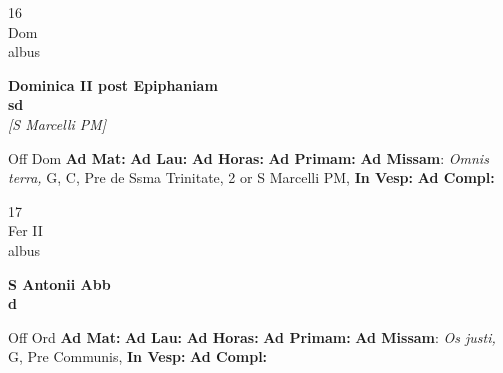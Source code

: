 \documentclass[10pt, openany]{book}
\begin{document}
        \begin{center}
            \begin{minipage}{3.5in}
                \vspace{2em}
                \begin{minipage}{0.5in}
                    {\Huge 16} \\
                    {\normalsize Dom} \\
                    {\normalsize albus}
                \end{minipage}
                \begin{minipage}{3.0in}
                    \textbf{ \large Dominica II post Epiphaniam \\
                    \textnormal{\normalsize sd}} \\ \textit{[S Marcelli PM]} \\ 
                \end{minipage}
                \begin{justify}Off Dom
                    \textbf{Ad Mat: }
                    \textbf{Ad Lau: }
                    \textbf{Ad Horas: }
                    \textbf{Ad Primam: }\textbf{Ad Missam}: \textit{Omnis terra,} G, C, Pre de Ssma Trinitate, 2 or S Marcelli PM,  
                    \textbf{In Vesp: }
                    \textbf{Ad Compl: }
                \end{justify}
            \end{minipage}
        \end{center}
    
        \begin{center}
            \begin{minipage}{3.5in}
                \vspace{2em}
                \begin{minipage}{0.5in}
                    {\Huge 17} \\
                    {\normalsize Fer II} \\
                    {\normalsize albus}
                \end{minipage}
                \begin{minipage}{3.0in}
                    \textbf{ \large S Antonii Abb \\
                    \textnormal{\normalsize d}} \\ 
                \end{minipage}
                \begin{justify}Off Ord
                    \textbf{Ad Mat: }
                    \textbf{Ad Lau: }
                    \textbf{Ad Horas: }
                    \textbf{Ad Primam: }\textbf{Ad Missam}: \textit{Os justi,} G, Pre Communis,  
                    \textbf{In Vesp: }
                    \textbf{Ad Compl: }
                \end{justify}
            \end{minipage}
        \end{center}
    
\end{document}
